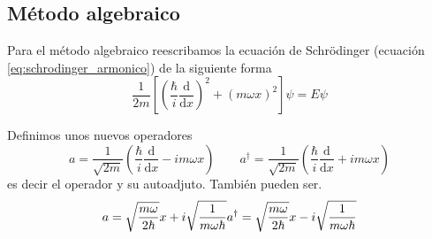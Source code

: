 \documentclass{book}
\numberwithin{equation}{section} %
\begin{document}
\subsection{Método algebraico}
Para el método algebraico reescribamos la ecuación de Schrödinger (ecuación \ref{eq:schrodinger_armonico}) de la siguiente forma
\begin{equation}
\frac{1}{2m} \left[\left(\frac{\hbar}{i} \frac{\mathrm{d}}{\mathrm{d}x}\right)^2 + (m \omega x)^2\right]\psi = E\psi
\label{eq:armonico_schrodinger_operador}
\end{equation}

Definimos unos nuevos operadores
\begin{equation}
    a = \frac{1}{\sqrt{2m}} \left(\frac{\hbar}{i} \frac{\mathrm{d}}{\mathrm{d}x} - i m \omega x\right) \qquad 
    a^{\dagger} = \frac{1}{\sqrt{2m}} \left(\frac{\hbar}{i} \frac{\mathrm{d}}{\mathrm{d}x} + i m \omega x\right)
\end{equation}
es decir el operador y su autoadjuto.
También pueden ser.
\begin{equation}
    a = \sqrt{\frac{m \omega}{2 \hbar}} x + i \sqrt{\frac{1}{m \omega \hbar}} \\ a^{\dagger} =  \sqrt{\frac{m \omega}{2 \hbar}} x - i \sqrt{\frac{1}{m \omega \hbar}}
\end{equation}
\end{document}
